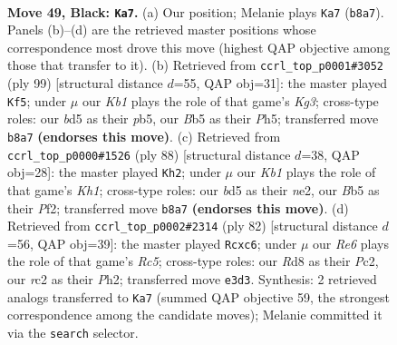 \documentclass[11pt]{article}
\begin{document}
\clearpage

\begin{figure}[p]\centering
\begin{subfigure}{0.46\textwidth}\centering
\resizebox{\linewidth}{!}{%
\newchessgame
\chessboard[
  setfen={1k1r4/8/8/1b1B1p1N/1P1R4/4rN2/2R3P1/3K4 b - - 14 49},
  showmover=false,
  pgfstyle=straightmove, color=movearrow, markmove={b8-a7}
]}
\caption{}
\end{subfigure}\hfill
\begin{subfigure}{0.46\textwidth}\centering
\resizebox{\linewidth}{!}{%
\newchessgame
\chessboard[
  setfen={8/2r5/1r4k1/1P5p/6p1/1R6/5P2/1R4K1 b - - 1 50},
  showmover=false,
  pgfstyle=straightmove, color=movearrow, markmove={g6-f5}
]}
\caption{}
\end{subfigure}
\\[4pt]
\begin{subfigure}{0.46\textwidth}\centering
\resizebox{\linewidth}{!}{%
\newchessgame
\chessboard[
  setfen={6B1/1R5p/5r1k/5p2/4r3/7P/4nP2/4R2K w - - 12 45},
  showmover=false,
  pgfstyle=straightmove, color=movearrow, markmove={h1-h2}
]}
\caption{}
\end{subfigure}\hfill
\begin{subfigure}{0.46\textwidth}\centering
\resizebox{\linewidth}{!}{%
\newchessgame
\chessboard[
  setfen={2r5/4rpk1/1PnR4/2R4p/6p1/8/2P4P/2K5 w - - 0 42},
  showmover=false,
  pgfstyle=straightmove, color=movearrow, markmove={c5-c6}
]}
\caption{}
\end{subfigure}
\caption{\textbf{Move 49, Black: \texttt{Ka7}.} (a) Our position; Melanie plays \texttt{Ka7} (\texttt{b8a7}). Panels (b)--(d) are the retrieved master positions whose correspondence most drove this move (highest QAP objective among those that transfer to it). (b) Retrieved from \texttt{ccrl\_top\_p0001\#3052} (ply 99) [structural distance $d$=55, QAP obj=31]: the master played \texttt{Kf5}; under $\mu$ our \emph{Kb1} plays the role of that game's \emph{Kg3}; cross-type roles: our \emph{b}d5 as their \emph{p}b5, our \emph{B}b5 as their \emph{P}h5; transferred move \texttt{b8a7} \textbf{(endorses this move)}. (c) Retrieved from \texttt{ccrl\_top\_p0000\#1526} (ply 88) [structural distance $d$=38, QAP obj=28]: the master played \texttt{Kh2}; under $\mu$ our \emph{Kb1} plays the role of that game's \emph{Kh1}; cross-type roles: our \emph{b}d5 as their \emph{n}e2, our \emph{B}b5 as their \emph{P}f2; transferred move \texttt{b8a7} \textbf{(endorses this move)}. (d) Retrieved from \texttt{ccrl\_top\_p0002\#2314} (ply 82) [structural distance $d$=56, QAP obj=39]: the master played \texttt{Rcxc6}; under $\mu$ our \emph{Re6} plays the role of that game's \emph{Rc5}; cross-type roles: our \emph{R}d8 as their \emph{P}c2, our \emph{r}c2 as their \emph{P}h2; transferred move \texttt{e3d3}. Synthesis: 2 retrieved analogs transferred to \texttt{Ka7} (summed QAP objective 59, the strongest correspondence among the candidate moves); Melanie committed it via the \texttt{search} selector.}
\label{fig:thought-m97}
\end{figure}
\end{document}
